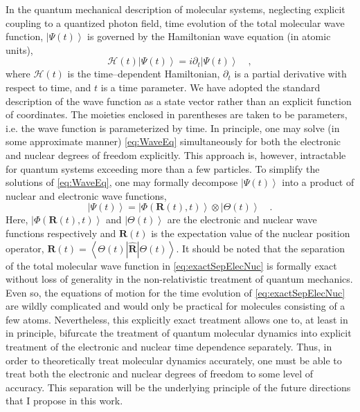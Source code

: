 \documentclass[12pt]{article}
\newcommand{\ket}[1]{\left\vert #1 \right\rangle}         %
\newcommand{\innerop}[3]{\left\langle #1 \left\vert #2 \right\vert #3 \right\rangle}  %
\newcommand*\vc[1]{\boldsymbol{#1}}
\begin{document}
In the quantum mechanical description of molecular systems, neglecting explicit
coupling to a quantized photon field, time evolution of the total molecular wave
function, $\ket{\Psi (t)}$ is governed by the Hamiltonian wave equation 
(in atomic units),
\begin{equation}
\mathscr{H}(t) \ket{\Psi (t)} = i\partial_t \ket{\Psi(t)} \quad,
\label{eq:WaveEq}
\end{equation}
where $\mathscr{H}(t)$ is the time--dependent Hamiltonian, $\partial_t$ is a
partial derivative with respect to time, and $t$ is a time parameter. We have
adopted the standard description of the wave function as a state vector rather
than an explicit function of coordinates. The moieties enclosed in parentheses
are taken to be parameters, i.e. the wave function is parameterized by time.  In
principle, one may solve (in some approximate manner) \cref{eq:WaveEq}
simultaneously for both the electronic and nuclear degrees of freedom
explicitly. This approach is, however, intractable for quantum systems exceeding
more than a few particles. To simplify the solutions of \cref{eq:WaveEq}, one
may formally decompose $\ket{\Psi (t)}$ into a product of nuclear and electronic
wave functions,
\begin{equation} 
\ket{\Psi (t)} = \ket{\Phi(\vc{R}(t),t)}\otimes\ket{\Theta(t)} 
\quad .  
\label{eq:exactSepElecNuc}
\end{equation} 
Here, $\ket{\Phi(\vc{R}(t),t)}$ and $\ket{\Theta (t)}$ are the electronic and
nuclear wave functions respectively and $\vc{R}(t)$ is the expectation value of
the nuclear position operator, $\vc{R}(t) =
\innerop{\Theta(t)}{\hat{\vc{R}}}{\Theta(t)}$.  It should be noted that the
separation of the total molecular wave function in \cref{eq:exactSepElecNuc} is
formally exact\cite{Gross10_PRL123002, Cederbaum08_JCP124101} without loss of
generality in the non-relativistic treatment of quantum mechanics. Even so, the
equations of motion for the time evolution of \cref{eq:exactSepElecNuc} are
wildly complicated\cite{Ghosh15_MP1} and would only be practical for molecules
consisting of a few atoms.  Nevertheless, this explicitly exact treatment allows
one to, at least in in principle, bifurcate the treatment of quantum molecular
dynamics into explicit treatment of the electronic and nuclear time dependence
separately.  Thus, in order to theoretically treat molecular dynamics
accurately, one must be able to treat both the electronic and nuclear degrees of
freedom to some level of accuracy.  This separation will be the underlying
principle of the future directions that I propose in this work.
\end{document}
